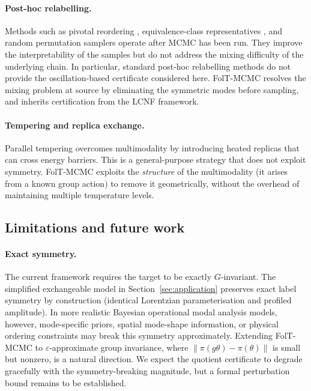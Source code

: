 \paragraph{Post-hoc relabelling.}
Methods such as pivotal reordering \citep{Stephens2000},
equivalence-class representatives \citep{Papastamoulis2010}, and
random permutation samplers \citep{FruhwirthSchnatter2001}
operate after MCMC has been run.  They improve the
interpretability of the samples but do not address the mixing
difficulty of the underlying chain.  In particular, standard post-hoc relabelling methods do not
provide the oscillation-based certificate considered here.  FolT-MCMC
resolves the mixing problem at source by eliminating the
symmetric modes before sampling, and inherits certification from
the LCNF framework.

\paragraph{Tempering and replica exchange.}
Parallel tempering \citep{Geyer1991,Earl2005} overcomes
multimodality by introducing heated replicas that can cross
energy barriers.  This is a general-purpose strategy that does
not exploit symmetry.  FolT-MCMC exploits the \emph{structure} of
the multimodality (it arises from a known group action) to remove
it geometrically, without the overhead of maintaining multiple
temperature levels.


\subsection{Limitations and future work}
\label{sec:disc_limitations}

\paragraph{Exact symmetry.}
The current framework requires the target to be exactly
$G$-invariant.  The simplified exchangeable model in
Section~\ref{sec:application} preserves exact label symmetry by
construction (identical Lorentzian parameterisation and profiled
amplitude).  In more realistic Bayesian operational modal analysis
models, however, mode-specific priors, spatial mode-shape
information, or physical ordering constraints may break this
symmetry approximately.  Extending FolT-MCMC to
$\varepsilon$-approximate group invariance, where
$\|\pi(g\theta) - \pi(\theta)\|$ is small but nonzero, is a
natural direction.  We expect the quotient certificate to degrade
gracefully with the symmetry-breaking magnitude, but a formal
perturbation bound remains to be established.

